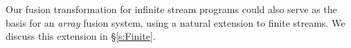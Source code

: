 Our fusion transformation for infinite stream programs could also serve as the basis for an \emph{array} fusion system, using a natural extension to finite streams. We discuss this extension in \S\ref{s:Finite}.








